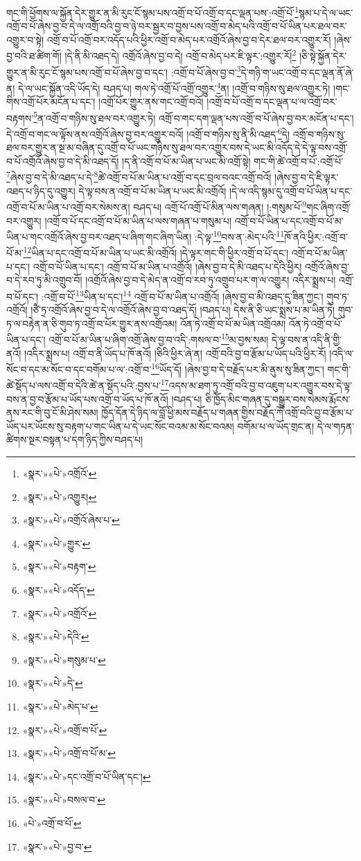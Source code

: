 གང་གི་ཕྱོགས་ལ་སྐྱོན་དེར་གྱུར་ན་མི་རུང་ངོ་སྙམ་པས་འགྲོ་བ་པོ་འགྲོ་བ་དང་ལྡན་པས་:འགྲོ་པོ་\footnote{«སྣར་»«པེ་»འགྲོའོ་}སྙམ་པ་དེ་ལ་ཡང་འགྲོ་བ་པོ་ཞེས་བྱ་བ་དེ་ལ་འགྲོ་བའི་བྱ་བ་ཉེ་བར་སྦྱར་བ་བྱས་པས་འགྲོ་བ་མེད་པའི་འགྲོ་བ་པོ་ཡིན་པར་ཐལ་བར་འགྱུར་བ་སྟེ། འགྲོ་བ་པོ་འགྲོ་བར་འདོད་པའི་ཕྱིར་འགྲོ་བ་མེད་པར་འགྲོའོ་ཞེས་བྱ་བ་དེར་ཐལ་བར་འགྱུར་རོ། །ཞེས་བྱ་བའི་ཐ་ཚིག་གོ། །དེ་ནི་མི་འཐད་དེ། འགྲོའོ་ཞེས་བྱ་བ་དེ། འགྲོ་བ་མེད་པར་ཇི་ལྟར་:འགྱུར་རོ།\footnote{«སྣར་»«པེ་»འགྱུར།} །ཅི་སྟེ་སྐྱོན་དེར་གྱུར་ན་མི་རུང་ངོ་སྙམ་པས་འགྲོ་བ་པོ་ཞེས་བྱ་བ་དང་། :འགྲོ་བ་པོ་ཞེས་བྱ་བ་\footnote{«སྣར་»«པེ་»འགྲོའོ་ཞེས་པ་}དེ་གཉི་ག་ཡང་འགྲོ་བ་དང་ལྡན་ནོ་ཞེ་ན། དེ་ལ་ཡང་སྐྱོན་འདི་ཡོད་དེ། བཤད་པ། གལ་ཏེ་འགྲོ་པོ་འགྲོ་འགྱུར་\footnote{«སྣར་»«པེ་»གྱུར་}ན། །འགྲོ་བ་གཉིས་སུ་ཐལ་འགྱུར་ཏེ། །གང་གིས་འགྲོ་པོར་མངོན་པ་དང་། །འགྲོ་པོར་གྱུར་ནས་གང་འགྲོ་བའོ། །འགྲོ་བ་པོ་འགྲོ་བ་དང་ལྡན་པ་ལ་འགྲོ་བར་བརྟགས་\footnote{«སྣར་»«པེ་»བརྟག་}ན་འགྲོ་བ་གཉིས་སུ་ཐལ་བར་འགྱུར་ཏེ། འགྲོ་བ་གང་དག་ལྡན་པས་འགྲོ་བ་པོ་ཞེས་བྱ་བར་མངོན་པ་དང་། དེ་འགྲོ་བ་གང་ལ་ལྟོས་ནས་འགྲོའོ་ཞེས་བྱ་བར་འགྱུར་བའོ། །འགྲོ་བ་གཉིས་སུ་ནི་མི་འཐད་\footnote{«སྣར་»«པེ་»འདོད་}དེ། འགྲོ་བ་གཉིས་སུ་ཐལ་བར་གྱུར་ན་སྔ་མ་བཞིན་དུ་འགྲོ་བ་པོ་ཡང་གཉིས་སུ་ཐལ་བར་འགྱུར་བས་དེ་ཡང་མི་འདོད་དེ་དེ་ལྟ་བས་འགྲོ་བ་པོ་འགྲོའོ་ཞེས་བྱ་བ་དེ་མི་འཐད་དོ། །ད་ནི་འགྲོ་བ་པོ་མ་ཡིན་པ་ཡང་མི་འགྲོ་སྟེ། གང་གི་ཚེ་འགྲོ་བ་པོ་:འགྲོ་པོ་\footnote{«སྣར་»«པེ་»འགྲོའོ་}ཞེས་བྱ་བ་དེ་མི་འཐད་པ་དེ་\footnote{«སྣར་»«པེ་»དེའི་}ཚེ་འགྲོ་བ་པོ་མ་ཡིན་པ་འགྲོ་བ་དང་བྲལ་བའང་འགྲོ་བའོ། །ཞེས་བྱ་བ་དེ་ཇི་ལྟར་འཐད་པ་ཉིད་དུ་འགྱུར། དེ་ལྟ་བས་ན་འགྲོ་བ་པོ་མ་ཡིན་པ་ཡང་མི་འགྲོའོ། །དེ་ལ་འདི་སྙམ་དུ་འགྲོ་བ་པོ་ཡིན་པ་དང་འགྲོ་བ་པོ་མ་ཡིན་པ་འགྲོ་བར་སེམས་ན། བཤད་པ། འགྲོ་པོ་འགྲོ་པོ་མིན་ལས་གཞན། །:གསུམ་པོ་\footnote{«སྣར་»«པེ་»གསུམ་པ་}གང་ཞིག་འགྲོ་བར་འགྱུར། །འགྲོ་བ་པོ་དང་འགྲོ་བ་པོ་མ་ཡིན་པ་ལས་གཞན་པ་གསུམ་པ། འགྲོ་བ་པོ་ཡིན་པ་དང་འགྲོ་བ་པོ་མ་ཡིན་པ་གང་འགྲོའོ་ཞེས་བྱ་བར་འཐད་པ་ཞིག་གང་ཞིག་ཡིན། :དེ་ལྟ་\footnote{«སྣར་»«པེ་»དེ་}བས་ན་:མེད་པའི་\footnote{«སྣར་»«པེ་»མེད་པ་}ཁོ་ནའི་ཕྱིར་:འགྲོ་བ་པོ་མ་\footnote{«སྣར་»«པེ་»འགྲོ་བ་པོ་}ཡིན་པ་དང་འགྲོ་བ་པོ་མ་ཡིན་པ་ཡང་མི་འགྲོའོ། །དེ་ལྟར་གང་གི་ཕྱིར་འགྲོ་བ་པོ་དང་། འགྲོ་བ་པོ་མ་ཡིན་པ་དང་། འགྲོ་བ་པོ་ཡིན་པ་དང་། འགྲོ་བ་པོ་མ་ཡིན་པ་འགྲོའོ། །ཞེས་བྱ་བ་དེ་མི་འཐད་པ་དེའི་ཕྱིར། འགྲོའོ་ཞེས་བྱ་བ་དེ་རབ་ཏུ་མི་འགྲུབ་བོ། །འགྲོའོ་ཞེས་བྱ་བ་དེ་མེད་ན་འགྲོ་བ་རབ་ཏུ་འགྲུབ་པར་ག་ལ་འགྱུར། འདིར་སྨྲས་པ། འགྲོ་བ་པོ་དང་། :འགྲོ་བ་པོ་\footnote{«སྣར་»«པེ་»འགྲོ་བ་པོ་མ་}ཡིན་པ་དང་།\footnote{«སྣར་»«པེ་»དང་འགྲོ་བ་པོ་ཡིན་དང་།} འགྲོ་བ་པོ་མ་ཡིན་པ་འགྲོའོ། །ཞེས་བྱ་བ་མི་འཐད་དུ་ཟིན་ཀྱང་། གུབ་ཏ་འགྲོའོ། །ཙཻ་ཏྲ་འགྲོའོ་ཞེས་བྱ་བ་དེ་ལ་འགྲོའོ་ཞེས་བྱ་བ་འཐད་དོ། །བཤད་པ། དེས་ནི་ཅི་ཡང་སྨྲས་པ་མ་ཡིན་ཏེ། གུབ་ཏ་ལ་བརྟེན་ན་ཅི་གུབ་ཏ་འགྲོ་བ་པོར་གྱུར་ནས་འགྲོའམ། འོན་ཏེ་འགྲོ་བ་པོ་མ་ཡིན་འགྲོའམ། འོན་ཏེ་འགྲོ་བ་པོ་ཡིན་པ་དང་། འགྲོ་བ་པོ་མ་ཡིན་པ་ཞིག་འགྲོ་ཞེས་བྱ་བ་འདི་:གསལ་བ་\footnote{«སྣར་»«པེ་»བསལ་བ་}མ་བྱས་སམ། དེ་ལྟ་བས་ན་འདི་ནི་གྱི་ནའོ། །འདིར་སྨྲས་པ། འགྲོ་བ་ནི་ཡོད་པ་ཁོ་ནའོ། །ཅིའི་ཕྱིར་ཞེ་ན། འགྲོ་བའི་བྱ་བ་རྩོམ་པ་ཡོད་པའི་ཕྱིར་རོ། །འདི་ལ་སོང་བ་དང་མ་སོང་བ་དང་བགོམ་པ་ལ་:འགྲོ་བ་\footnote{«པེ་»འགྲོ་བ་པོ་}ཡོད་དོ། །ཞེས་བྱ་བ་དེ་བརྗོད་པར་མི་ནུས་སུ་ཟིན་ཀྱང་། གང་གི་ཚེ་སྡོད་པ་ལས་འགྲོ་བ་དེའི་ཚེ་ན་སྡོད་པའི་:བྱས་པ་\footnote{«སྣར་»«པེ་»བྱ་བ་}འདས་མ་ཐག་ཏུ་འགྲོ་བའི་བྱ་བ་འཇུག་པར་འགྱུར་བས་དེ་ལྟ་བས་ན་བྱ་བ་རྩོམ་པ་ཡོད་པས་འགྲོ་བ་ཡོད་པ་ཁོ་ནའོ། །བཤད་པ། ཅི་ཁྱོད་མིང་གཞན་དུ་བསྒྱུར་བས་སེམས་རྨོངས་ནས་རང་གི་བུ་ངོ་མི་ཤེས་སམ། ཁྱོད་དོན་དེ་ཉིད་ལ་བློ་ཕྱི་མས་བརྗོད་པ་གཞན་གྱིས་བརྗོད་ཀོ་འགྲོ་བའི་བྱ་བ་རྩོམ་པ་ཡོད་པར་ཡོངས་སུ་བརྟག་པ་གང་ཡིན་པ་དེ་ཡང་སོང་བའམ་མ་སོང་བའམ། བགོམ་པ་ལ་ཡོད་གྲང་ན། དེ་ལ་གཏན་ཚིགས་སྔར་བསྟན་པ་དག་ཉིད་ཀྱིས་བཤད་པ། 